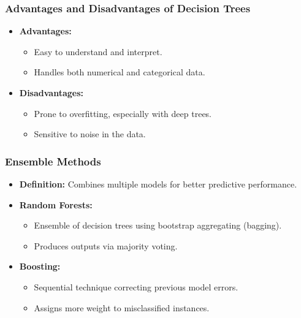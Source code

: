 \documentclass[aspectratio=169]{beamer}
\begin{document}
\begin{frame}[fragile]
    \frametitle{Advantages and Disadvantages of Decision Trees}
    \begin{itemize}
        \item \textbf{Advantages:}
            \begin{itemize}
                \item Easy to understand and interpret.
                \item Handles both numerical and categorical data.
            \end{itemize}
        \item \textbf{Disadvantages:}
            \begin{itemize}
                \item Prone to overfitting, especially with deep trees.
                \item Sensitive to noise in the data.
            \end{itemize}
    \end{itemize}
\end{frame}

\begin{frame}[fragile]
    \frametitle{Ensemble Methods}
    \begin{itemize}
        \item \textbf{Definition:} Combines multiple models for better predictive performance.
        \item \textbf{Random Forests:}
            \begin{itemize}
                \item Ensemble of decision trees using bootstrap aggregating (bagging).
                \item Produces outputs via majority voting.
            \end{itemize}
        \item \textbf{Boosting:}
            \begin{itemize}
                \item Sequential technique correcting previous model errors.
                \item Assigns more weight to misclassified instances.
            \end{itemize}
    \end{itemize}
\end{frame}
\end{document}
